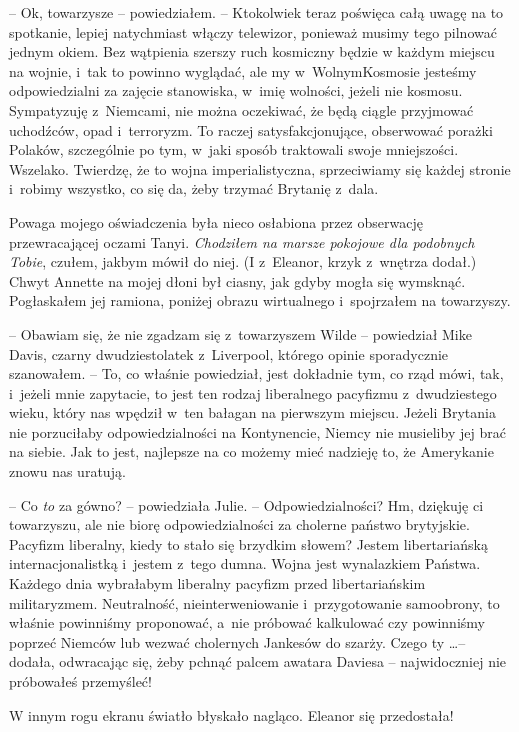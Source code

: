 \documentclass[oneside,polish,11pt,sfheadings]{mwbk}
\begin{document}
-- Ok, towarzysze -- powiedziałem. -- Ktokolwiek teraz poświęca całą uwagę
na to spotkanie, lepiej natychmiast włączy telewizor, ponieważ musimy
tego pilnować jednym okiem. Bez wątpienia szerszy ruch kosmiczny będzie
w każdym miejscu na wojnie, i~tak to powinno wyglądać, ale my w~WolnymKosmosie jesteśmy odpowiedzialni za zajęcie stanowiska, w~imię
wolności, jeżeli nie kosmosu. Sympatyzuję z~Niemcami, nie można
oczekiwać, że będą ciągle przyjmować uchodźców, opad i~terroryzm. To
raczej satysfakcjonujące, obserwować porażki Polaków, szczególnie po
tym, w~jaki sposób traktowali swoje mniejszości. Wszelako. Twierdzę, że
to wojna imperialistyczna, sprzeciwiamy się każdej stronie i~robimy
wszystko, co się da, żeby trzymać Brytanię z~dala.

Powaga mojego oświadczenia była nieco osłabiona przez obserwację
przewracającej oczami Tanyi. \emph{Chodziłem na marsze pokojowe dla
podobnych Tobie}, czułem, jakbym mówił do niej. (I z~Eleanor, krzyk z~wnętrza dodał.) Chwyt Annette na mojej dłoni był ciasny, jak gdyby mogła
się wymsknąć. Pogłaskałem jej ramiona, poniżej obrazu wirtualnego i~spojrzałem na towarzyszy.

-- Obawiam się, że nie zgadzam się z~towarzyszem Wilde -- powiedział Mike
Davis, czarny dwudziestolatek z~Liverpool, którego opinie sporadycznie
szanowałem. -- To, co właśnie powiedział, jest dokładnie tym, co rząd
mówi, tak, i~jeżeli mnie zapytacie, to jest ten rodzaj liberalnego
pacyfizmu z~dwudziestego wieku, który nas wpędził w~ten bałagan na
pierwszym miejscu. Jeżeli Brytania nie porzuciłaby odpowiedzialności na
Kontynencie, Niemcy nie musieliby jej brać na siebie. Jak to jest,
najlepsze na co możemy mieć nadzieję to, że Amerykanie znowu nas
uratują.

-- Co \emph{to} za gówno? -- powiedziała Julie. -- Odpowiedzialności? Hm,
dziękuję ci towarzyszu, ale nie biorę odpowiedzialności za cholerne
państwo brytyjskie. Pacyfizm liberalny, kiedy to stało się brzydkim
słowem? Jestem libertariańską internacjonalistką i~jestem z~tego dumna.
Wojna jest wynalazkiem Państwa. Każdego dnia wybrałabym liberalny
pacyfizm przed libertariańskim militaryzmem. Neutralność,
nieinterweniowanie i~przygotowanie samoobrony, to właśnie powinniśmy
proponować, a~nie próbować kalkulować czy powinniśmy poprzeć Niemców lub
wezwać cholernych Jankesów do szarży. Czego ty \ldots -- dodała, odwracając
się, żeby pchnąć palcem awatara Daviesa -- najwidoczniej nie próbowałeś
przemyśleć!

W innym rogu ekranu światło błyskało nagląco. Eleanor się przedostała!
\end{document}
